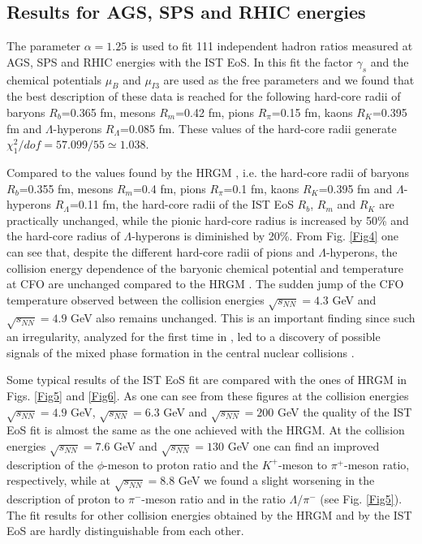 \documentclass[12pt]{article}
\begin{document}
\subsection{Results for AGS, SPS and RHIC energies}

The parameter  $\alpha =1.25$ is used to fit 111 independent hadron ratios measured at AGS, SPS and RHIC energies with the  IST EoS. In this fit the factor $\gamma_s$ and the chemical potentials  $\mu_B$ and $\mu_{I3}$  are used as the free parameters  and  we found that the best description of these data is reached for  the following 
hard-core radii of baryons $R_{b}$=0.365 fm, mesons $R_{m}$=0.42 fm, pions $R_{\pi}$=0.15 fm, kaons
$R_{K}$=0.395 fm and $\Lambda$-hyperons $R_{\Lambda}$=0.085 fm. 
These values of the hard-core radii generate $\chi_1^2/dof=57.099/55 \simeq 1.038$. 

Compared to the values found by the HRGM \cite{Veta14},
i.e. the  hard-core radii of baryons  $R_{b}$=0.355 fm, mesons $R_{m}$=0.4 fm, pions $R_{\pi}$=0.1 fm, kaons
$R_{K}$=0.395 fm and $\Lambda$-hyperons $R_{\Lambda}$=0.11 fm, the hard-core radii of the IST EoS $R_{b}$, $R_{m}$ and $R_{K}$ are practically unchanged,  while the pionic hard-core radius is increased by 50\% and  the hard-core radius of  
$\Lambda$-hyperons is  diminished by 20\%.  From Fig.  \ref{Fig4} one can see that, despite the different hard-core radii of pions and   $\Lambda$-hyperons,  the collision energy dependence of the baryonic chemical potential and temperature at CFO are unchanged 
compared to the HRGM \cite{Veta14}.   The sudden jump of the CFO temperature observed between the collision energies  $\sqrt{s_{NN}} = 4.3$ GeV and  $\sqrt{s_{NN}} = 4.9$ GeV also remains unchanged.  This is an important finding since  such an irregularity, analyzed for the first time in \cite{Bugaev:2014}, led to a discovery of  possible  signals of the mixed phase formation in the central nuclear collisions \cite{Bugaev:2014,Bugaev:2015}.

Some typical results of the IST EoS fit are compared with the ones of HRGM in Figs.   \ref{Fig5} and  \ref{Fig6}.
As one can see from these figures at the  collision energies   $\sqrt{s_{NN}} = 4.9$ GeV,  $\sqrt{s_{NN}} = 6.3$ GeV
and  $\sqrt{s_{NN}} = 200$ GeV
the quality of the IST EoS  fit is almost the same as the one achieved with the  HRGM. At the  collision energies   $\sqrt{s_{NN}} = 7.6$ GeV  and  $\sqrt{s_{NN}} = 130$ GeV one can find  an improved description  of the  $\phi$-meson to proton ratio and the $K^+$-meson to $\pi^+$-meson ratio, respectively, while at  $\sqrt{s_{NN}} = 8.8$ GeV we found 
a slight worsening in the description of proton to $\pi^-$-meson ratio and  in the ratio $\Lambda/\pi^-$ (see Fig. \ref{Fig5}). 
The  fit results for other collision energies  obtained by the  HRGM and  by the IST EoS are hardly distinguishable from each other.
\end{document}
